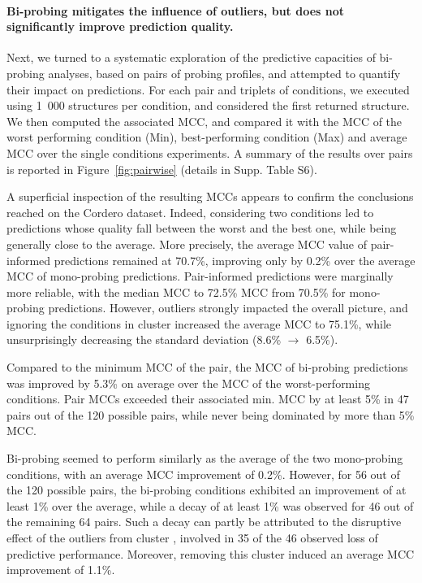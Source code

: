 \documentclass[a4,center,fleqn]{NAR}
\begin{document}
\paragraph{Bi-probing mitigates the influence of outliers, but does not significantly improve prediction quality.}
Next, we turned to a systematic exploration of the predictive capacities of bi-probing analyses, based on pairs of probing profiles, and attempted to quantify their impact on \OurTool predictions. For each pair and triplets of conditions, we executed \OurTool using 1~000 structures per condition, and considered the first returned structure. We then computed the associated MCC, and compared it with the MCC of the worst performing condition (Min), best-performing condition (Max) and average MCC over the single conditions experiments. A summary of the results over pairs is reported in Figure~\ref{fig:pairwise} (details in Supp. Table S6). 

A superficial inspection of the resulting MCCs appears to confirm the conclusions reached on the Cordero\etal\cite{Cordero2012} dataset. Indeed, considering two conditions led to predictions whose quality fall between the worst and the best one, while being generally close to the average. More precisely, the average MCC value of pair-informed predictions remained at 70.7\%, improving only by 0.2\% over the average MCC of mono-probing predictions. Pair-informed predictions were marginally more reliable, with the median MCC  to 72.5\% MCC from 70.5\% for mono-probing predictions. However, outliers strongly impacted the overall picture, and ignoring the conditions in cluster  increased the average MCC to 75.1\%, while unsurprisingly decreasing the standard deviation (8.6\% $\to$ 6.5\%).

Compared to the minimum MCC of the pair, the MCC of bi-probing predictions was improved by 5.3\% on average over the MCC of the worst-performing conditions. Pair MCCs exceeded their associated min. MCC by at least 5\% in 47 pairs out of the 120 possible pairs, while never being dominated by more than  5\% MCC. 

Bi-probing seemed to perform similarly as the average of the two mono-probing conditions, with an average MCC improvement of 0.2\%. However, for 56 out of the 120 possible pairs, the bi-probing conditions exhibited an improvement of at least 1\% over the average, while a decay of at least 1\% was observed for 46 out of the remaining 64 pairs. Such a decay can partly be attributed to the disruptive effect of the outliers from cluster , involved in 35 of the 46 observed loss of predictive performance. Moreover, removing this cluster induced an average MCC improvement of 1.1\%.
\end{document}
